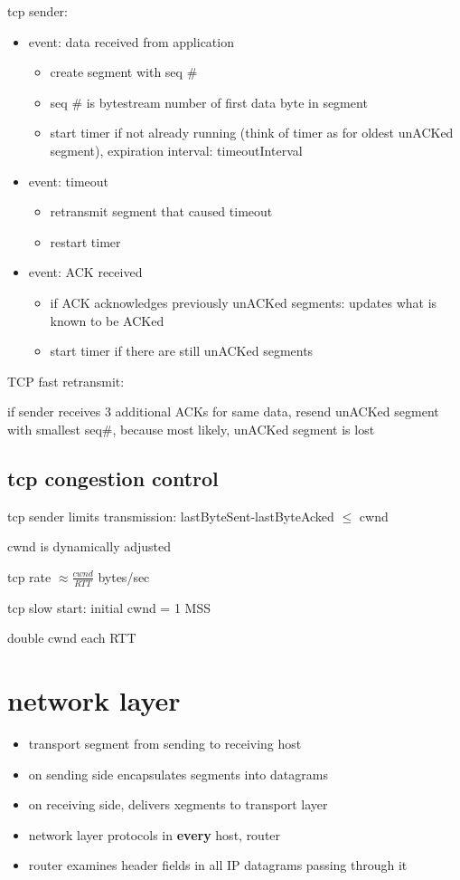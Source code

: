 \documentclass[10pt]{article}
\theoremstyle{break}
\begin{document}
tcp sender: 

\begin{itemize}
    \item event: data received from application  

    \begin{itemize}
        \item create segment with seq \#
        \item seq \# is bytestream number of first data byte in segment 
        \item start timer if not already running (think of timer as for oldest unACKed segment), expiration interval: timeoutInterval
    \end{itemize}
    \item event: timeout \begin{itemize}
        \item retransmit segment that caused timeout 
        \item restart timer
    \end{itemize}
    \item event: ACK received \begin{itemize}
        \item if ACK acknowledges previously unACKed segments: updates what is known to be ACKed 
        \item start timer if there are still unACKed segments
    \end{itemize}
\end{itemize}

TCP fast retransmit:

if sender receives 3 additional ACKs for same data, resend unACKed segment with smallest seq\#, because
most likely, unACKed segment is lost






\subsection{tcp congestion control}
tcp sender limits transmission: lastByteSent-lastByteAcked $\leq$ cwnd

cwnd is dynamically adjusted 

tcp rate $\approx \frac{cwnd}{RTT}$ bytes/sec

tcp slow start: initial cwnd = 1 MSS 

double cwnd each RTT

\section{network layer}
\begin{itemize}
    \item transport segment from sending to receiving host 
    \item on sending side encapsulates segments into datagrams 
    \item on receiving side, delivers xegments to transport layer 
    \item network layer protocols in \textbf{every} host, router 
    \item router examines header fields in all IP datagrams passing through it
\end{itemize}
\end{document}
